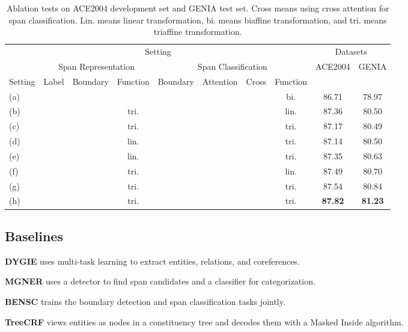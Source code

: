 \documentclass[11pt]{article}
\begin{document}
\begin{table*}[ht]
\small
\centering
\begin{tabular}{lccccccccc}
\toprule
\multicolumn{8}{c}{Setting} & \multicolumn{2}{c}{Datasets} \\

&\multicolumn{3}{c}{Span Representation} & \multicolumn{4}{c}{Span Classification} & ACE2004 & GENIA \\
Setting &Label & Boundary & Function & Boundary & Attention & Cross & Function & \multicolumn{2}{c}{}\\
\hline
(a)& &  &  &   &  &  & bi. & 86.71  & 78.97 \\
(b)& &  & tri. &  &  &  & lin. & 87.36 & 80.50   \\
(c)& &  & tri. &  &  &  & tri. & 87.17  & 80.49   \\
(d)& &  & lin. &  &  &  & tri. & 87.14 & 80.50  \\
(e)& &   & lin. &  &  &  & tri. & 87.35  & 80.63 \\
(f)& &  & tri. &  &  &  & lin. & 87.49  & 80.70 \\
(g)& &  & tri. &  &  &  & tri. & 87.54& 80.84\\
(h)& &  & tri. &  &  &  & tri. & \textbf{87.82} & \textbf{81.23} \\
\bottomrule
\end{tabular}
\caption{Ablation tests on ACE2004 development set and GENIA test set. Cross means using cross attention for span classification.
Lin. means linear transformation, bi. means biaffine transformation, and tri. means triaffine transformation.}
\label{main ablation}
\end{table*}

\subsection{Baselines}


\noindent\textbf{DYGIE} \cite{dygie} uses multi-task learning to extract entities, relations, and coreferences.

\noindent\textbf{MGNER} \cite{mgner} uses a detector to find span candidates and a classifier for categorization.

\noindent\textbf{BENSC} \cite{bensc} trains the boundary detection and span classification tasks jointly.

\noindent\textbf{TreeCRF} \cite{fu2021nested} views entities as nodes in a constituency tree and decodes them with a Masked Inside algorithm.
\end{document}
